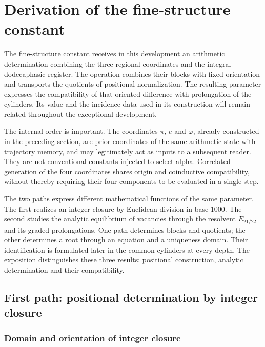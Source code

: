 \section{Derivation of the fine-structure constant}
\label{x_reciprocidad:sec:alpha}

The fine-structure constant receives in this development an arithmetic
determination combining the three regional coordinates and the integral
dodecaphasic register. The operation combines their blocks with fixed orientation and
transports the quotients of positional normalization. The resulting
parameter expresses the compatibility of that oriented difference with
prolongation of the cylinders. Its value and the incidence data
used in its construction will remain related throughout the
exceptional development.

The internal order is important. The coordinates \(\pi\),
\(e\) and \(\varphi\), already constructed in the preceding section, are prior coordinates
of the same arithmetic state with trajectory memory, and may legitimately act as
inputs to a subsequent reader. They are not conventional constants
injected to select alpha. Correlated generation of the four coordinates shares origin and
coinductive compatibility, without thereby requiring their four
components to be evaluated in a single step.

The two paths express different mathematical functions of the same parameter.
The first realizes an integer closure by Euclidean division in base
\(1000\). The second studies the analytic equilibrium of vacancies through
the resolvent \(E_{21/22}\) and its graded prolongations. One path
determines blocks and quotients; the other determines a root through an
equation and a uniqueness domain. Their identification is formulated later
in the common cylinders at every depth. The exposition distinguishes
these three results: positional construction, analytic determination
and their compatibility.

\subsection{First path: positional determination by integer closure}
\subsubsection{Domain and orientation of integer closure}
\label{x_reciprocidad:subsec:alpha-dominio}

